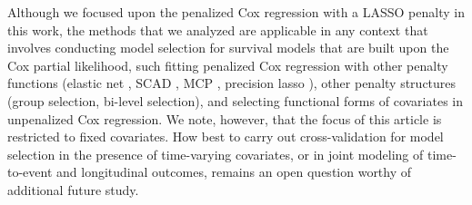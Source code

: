 Although we focused upon the penalized Cox regression with a LASSO penalty in this work, the methods that we analyzed are applicable in any context that involves conducting model selection for survival models that are built upon the Cox partial likelihood, such fitting penalized Cox regression with other penalty functions (elastic net \citep{Zou2005}, SCAD \citep{FanLi2001}, MCP \citep{Zhang2010}, precision lasso \citep{Wang2018}), other penalty structures (group selection, bi-level selection), and selecting functional forms of covariates in unpenalized Cox regression. We note, however, that the focus of this article is restricted to fixed covariates. How best to carry out cross-validation for model selection in the presence of time-varying covariates, or in joint modeling of time-to-event and longitudinal outcomes, remains an open question worthy of additional future study.





